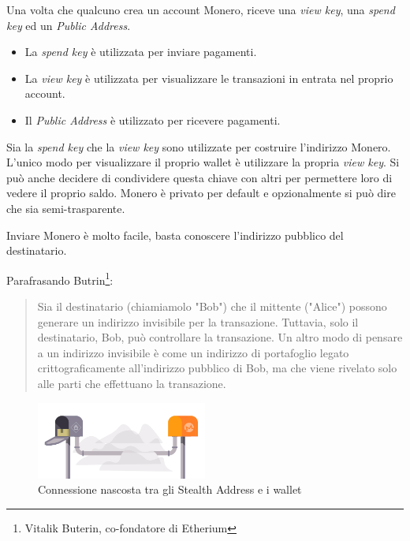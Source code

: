 \documentclass[12pt,a4paper]{article}
\begin{document}
    Una volta che qualcuno crea un account Monero, riceve una \textit{view key},
    una \textit{spend key} ed un \textit{Public Address}. 
    \begin{itemize}
        \item La \textit{spend key} è utilizzata per inviare pagamenti.
        \item La \textit{view key} è utilizzata per visualizzare le transazioni
        in entrata nel proprio account.
        \item Il \textit{Public Address} è utilizzato per ricevere pagamenti.
    \end{itemize}

    Sia la \textit{spend key} che la \textit{view key} sono utilizzate per
    costruire l'indirizzo Monero. L'unico modo per visualizzare il proprio
    wallet è utilizzare la propria \textit{view key}. Si può anche decidere di
    condividere questa chiave con altri per permettere loro di vedere il proprio
    saldo. Monero è privato per default e opzionalmente si può dire che sia
    semi-trasparente.

    Inviare Monero è molto facile, basta conoscere l'indirizzo pubblico del
    destinatario.
    
    Parafrasando Butrin\footnote{Vitalik Buterin, co-fondatore di Etherium}:
    \begin{quote}
        Sia il destinatario (chiamiamolo "Bob") che il mittente ("Alice")
        possono generare un indirizzo invisibile per la transazione. Tuttavia,
        solo il destinatario, Bob, può controllare la transazione. Un altro modo
        di pensare a un indirizzo invisibile è come un indirizzo di portafoglio
        legato crittograficamente all’indirizzo pubblico di Bob, ma che viene
        rivelato solo alle parti che effettuano la transazione. \cite{Buterin
        Quote}
    \end{quote}

    \begin{figure}[ht]
        \centering
        \includegraphics[width=0.5\textwidth]{./images/stealth_address.png}
        \caption{Connessione nascosta tra gli Stealth Address e i wallet}
        \label{fig:encription}
    \end{figure}
\end{document}
